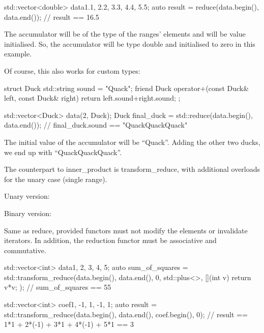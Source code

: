 \begin{box-note}
\begin{cppcode}
std::vector<double> data{1.1, 2.2, 3.3, 4.4, 5.5};
auto result = reduce(data.begin(), data.end());
// result == 16.5
\end{cppcode}
\end{box-note}

The accumulator will be of the type of the ranges’ elements and will be value initialised. So, the accumulator will be type double and initialised to zero in this example.

Of course, this also works for custom types:

\begin{box-note}
\begin{cppcode}
struct Duck {
    std::string sound = "Quack";
    friend Duck operator+(const Duck& left, const Duck& right) {
        return {left.sound+right.sound};
    }
};

std::vector<Duck> data(2, Duck{});
Duck final_duck = std::reduce(data.begin(), data.end());
// final_duck.sound == "QuackQuackQuack"
\end{cppcode}
\end{box-note}

The initial value of the accumulator will be “Quack”. Adding the other two ducks, we end up with “QuackQuackQuack”.

The counterpart to inner\_product is transform\_reduce, with additional overloads for the unary case (single range).


Unary version:


Binary version:


Same as reduce, provided functors must not modify the elements or invalidate iterators. In addition, the reduction functor must be associative and commutative.

\begin{box-note}
\begin{cppcode}
std::vector<int> data{1, 2, 3, 4, 5};
auto sum_of_squares = std::transform_reduce(data.begin(), data.end(), 0, 
                                            std::plus<>{}, [](int v) { return v*v; });
// sum_of_squares == 55

std::vector<int> coef{1, -1, 1, -1, 1};
auto result = std::transform_reduce(data.begin(), data.end(), coef.begin(), 0);
// result == 1*1 + 2*(-1) + 3*1 + 4*(-1) + 5*1 == 3
\end{cppcode}
\end{box-note}

